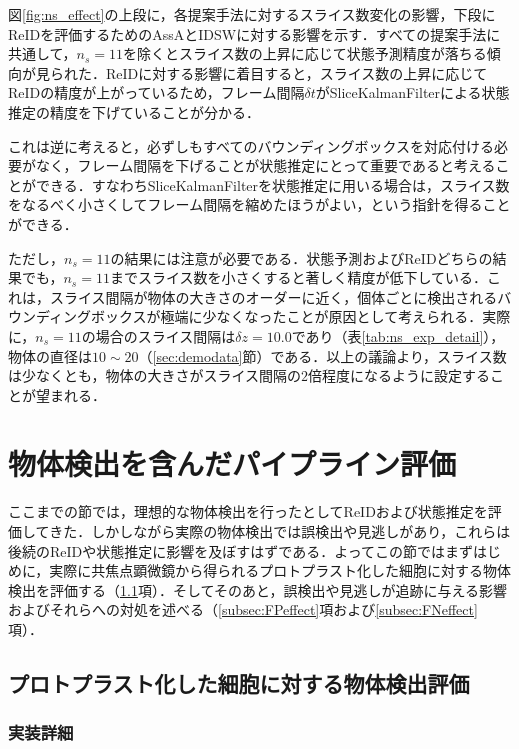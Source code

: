     図\ref{fig:ns_effect}の上段に，各提案手法に対するスライス数変化の影響，下段にReIDを評価するためのAssAとIDSWに対する影響を示す．すべての提案手法に共通して，$n_s = 11$を除くとスライス数の上昇に応じて状態予測精度が落ちる傾向が見られた．ReIDに対する影響に着目すると，スライス数の上昇に応じてReIDの精度が上がっているため，フレーム間隔$\delta t$がSliceKalmanFilterによる状態推定の精度を下げていることが分かる．

    これは逆に考えると，必ずしもすべてのバウンディングボックスを対応付ける必要がなく，フレーム間隔を下げることが状態推定にとって重要であると考えることができる．すなわちSliceKalmanFilterを状態推定に用いる場合は，スライス数をなるべく小さくしてフレーム間隔を縮めたほうがよい，という指針を得ることができる．

    ただし，$n_s = 11$の結果には注意が必要である．状態予測およびReIDどちらの結果でも，$n_s = 11$までスライス数を小さくすると著しく精度が低下している．これは，スライス間隔が物体の大きさのオーダーに近く，個体ごとに検出されるバウンディングボックスが極端に少なくなったことが原因として考えられる．実際に，$n_s = 11$の場合のスライス間隔は$\delta z = 10.0$であり（表\ref{tab:ns_exp_detail}），物体の直径は$10 \sim 20$（\ref{sec:demodata}節）である．以上の議論より，スライス数は少なくとも，物体の大きさがスライス間隔の$2$倍程度になるように設定することが望まれる．

\section{物体検出を含んだパイプライン評価}
\label{sec:pipleline_evaluation_with_detection}

ここまでの節では，理想的な物体検出を行ったとしてReIDおよび状態推定を評価してきた．しかしながら実際の物体検出では誤検出や見逃しがあり，これらは後続のReIDや状態推定に影響を及ぼすはずである．よってこの節ではまずはじめに，実際に共焦点顕微鏡から得られるプロトプラスト化した細胞に対する物体検出を評価する（\ref{subsec:detection_of_protoplast}項）．そしてそのあと，誤検出や見逃しが追跡に与える影響およびそれらへの対処を述べる（\ref{subsec:FPeffect}項および\ref{subsec:FNeffect}項）．

    \subsection{プロトプラスト化した細胞に対する物体検出評価}
    \label{subsec:detection_of_protoplast}

    \subsubsection{実装詳細}

